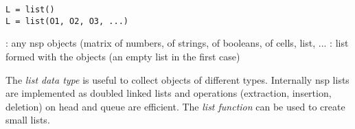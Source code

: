 
\begin{mandesc}
\end{mandesc}

\begin{calling_sequence}
\begin{verbatim}
L = list()
L = list(O1, O2, O3, ...)
\end{verbatim}
\end{calling_sequence}
\begin{parameters}
  \begin{varlist}
     :  any nsp objects (matrix of numbers, of
    strings, of booleans, of cells, list, ... 
     : list formed with the objects (an empty list in the
    first case)
  \end{varlist}
\end{parameters}

\begin{mandescription}
The \emph{list data type} is useful to collect objects of different
types. Internally nsp lists are implemented as doubled linked lists
and operations (extraction, insertion, deletion) on head and queue
are efficient. The \emph{list function} can be used to create small
lists.  
\end{mandescription}

